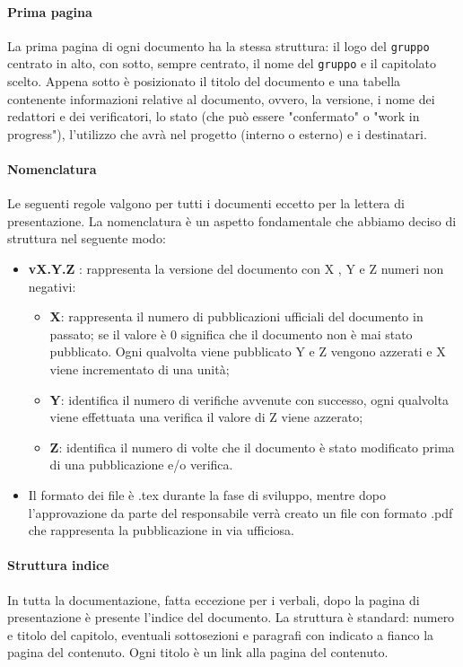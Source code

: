 \paragraph{Prima pagina\\} 
La prima pagina di ogni documento ha la stessa struttura: il logo del \texttt{gruppo} centrato in alto, con sotto, sempre centrato, il nome del \texttt{gruppo} e il capitolato scelto. Appena sotto è posizionato il titolo del documento e una tabella contenente informazioni relative al documento, ovvero, la versione, i nome dei redattori e dei verificatori, lo stato (che può essere "confermato" o "work in progress"), l'utilizzo che avrà nel progetto (interno o esterno) e i destinatari.

\paragraph{Nomenclatura\\}
Le seguenti regole valgono per tutti i documenti eccetto per la lettera di presentazione. La nomenclatura è un aspetto fondamentale che abbiamo deciso di struttura nel seguente modo: 
\begin{itemize}
	\item \textbf{vX.Y.Z }: rappresenta la versione del documento con X , Y e Z numeri non negativi:
	\begin{itemize}
		\item \textbf{X}: rappresenta il numero di pubblicazioni ufficiali del documento in passato; se il valore è 0 significa che il documento non è mai stato pubblicato. Ogni qualvolta viene pubblicato Y e Z vengono azzerati e X viene incrementato di una unità;
		\item \textbf{Y}: identifica il numero di verifiche avvenute con successo, ogni qualvolta viene effettuata una verifica il valore di Z viene azzerato;
		\item \textbf{Z}: identifica il numero di volte che il documento è stato modificato prima di una pubblicazione e/o verifica.
	\end{itemize}
	\item Il formato dei file è .tex durante la fase di sviluppo, mentre dopo l'approvazione da parte del responsabile verrà creato un file con formato .pdf che rappresenta la pubblicazione in via ufficiosa.
\end{itemize}

\paragraph{Struttura indice\\}
In tutta la documentazione, fatta eccezione per i verbali, dopo la pagina di presentazione è presente l'indice del documento. La struttura è standard: numero e titolo del capitolo, eventuali sottosezioni e paragrafi con indicato a fianco la pagina del contenuto. Ogni titolo è un link alla pagina del contenuto. 

